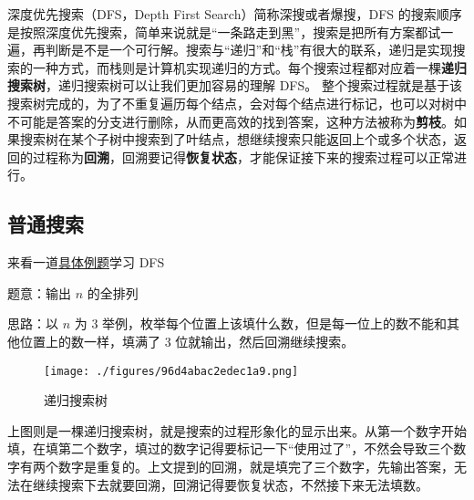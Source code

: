 
深度优先搜索（DFS，Depth First Search）简称深搜或者爆搜，DFS 的搜索顺序是按照深度优先搜索，简单来说就是“一条路走到黑”，搜索是把所有方案都试一遍，再判断是不是一个可行解。搜索与“递归”和“栈”有很大的联系，递归是实现搜索的一种方式，而栈则是计算机实现递归的方式。每个搜索过程都对应着一棵\textbf{递归搜索树}，递归搜索树可以让我们更加容易的理解 DFS。
整个搜索过程就是基于该搜索树完成的，为了不重复遍历每个结点，会对每个结点进行标记，也可以对树中不可能是答案的分支进行删除，从而更高效的找到答案，这种方法被称为\textbf{剪枝}。如果搜索树在某个子树中搜索到了叶结点，想继续搜索只能返回上个或多个状态，返回的过程称为\textbf{回溯}，回溯要记得\textbf{恢复状态}，才能保证接下来的搜索过程可以正常进行。


\subsection{普通搜索}
来看一道\href{https://www.luogu.com.cn/problem/P1706}{具体例题}学习 DFS

题意：输出 $n$ 的全排列

思路：以 $n$ 为 $3$ 举例，枚举每个位置上该填什么数，但是每一位上的数不能和其他位置上的数一样，填满了 $3$ 位就输出，然后回溯继续搜索。

\begin{figure}[ht]
\centering
\texttt{[image: ./figures/96d4abac2edec1a9.png]}
\caption{递归搜索树} \label{fig_DFS_1}
\end{figure}

上图则是一棵递归搜索树，就是搜索的过程形象化的显示出来。从第一个数字开始填，在填第二个数字，填过的数字记得要标记一下“使用过了”，不然会导致三个数字有两个数字是重复的。上文提到的回溯，就是填完了三个数字，先输出答案，无法在继续搜索下去就要回溯，回溯记得要恢复状态，不然接下来无法填数。

